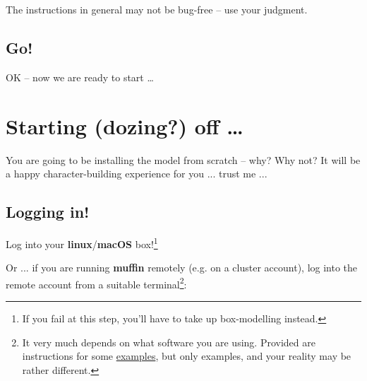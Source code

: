 \documentclass[11pt,fleqn]{book} %
\begin{document}
The instructions in general may not be bug-free – use your judgment.


\subsection*{Go!}

OK – now we are ready to start …


\newpage


\section{Starting (dozing?) off …}

You are going to be installing the model from scratch – why? Why not? It will be a happy character-building experience for you ... trust me ...


\subsection{Logging in!}

Log into your \textbf{linux}/\textbf{macOS} box!\footnote{If you fail at this step, you'll have to take up box-modelling instead.}

\noindent Or ... if you are running \textbf{muffin} remotely (e.g. on a cluster account), log into the remote account from a suitable terminal\footnote{It very much depends on what software you are using. Provided are instructions for some \uline{examples}, but only examples, and your reality may be rather different.}:
\end{document}
